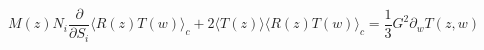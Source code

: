 \begin{equation} 
M(z)N_i \frac{\partial}{\partial S_i}\langle R(z) T(w)\rangle_c + 
2\langle T(z)\rangle 
\langle R(z) T(w)\rangle_c = \frac{1}{3}
G^2 \partial_w T(z,w)   
\end{equation}

